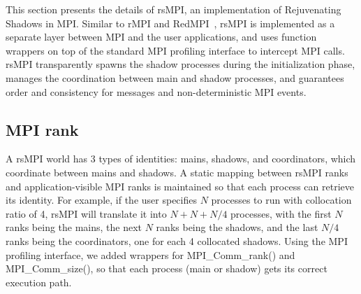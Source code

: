 This section presents the details of rsMPI, an implementation of Rejuvenating Shadows in MPI. 
Similar to rMPI and RedMPI~\cite{ferreira_sc_2011,fiala_2012_sdc}, rsMPI is implemented as a separate layer between MPI and the user applications, and uses function wrappers on top of the standard MPI profiling interface to intercept MPI calls. 
rsMPI transparently spawns the shadow processes during the initialization phase, manages the coordination between main and shadow processes, and guarantees order and consistency for messages and non-deterministic MPI events.

\subsection{MPI rank}
A rsMPI world has 3 types of identities: mains, shadows, and coordinators, which coordinate between mains and shadows. A static mapping between rsMPI ranks and application-visible MPI ranks is maintained so that each process can retrieve its identity. For example, if the user specifies $N$ processes to run with collocation ratio of 4, rsMPI will translate it into $N + N + N/4$ processes, %
with the first $N$ ranks being the mains, the next $N$ ranks being the shadows, and the last $N/4$ ranks being the coordinators, one for each 4 collocated shadows. 
Using the MPI profiling interface, we added wrappers for MPI\_Comm\_rank() and MPI\_Comm\_size(), so that each process (main or shadow) gets its correct execution path.


